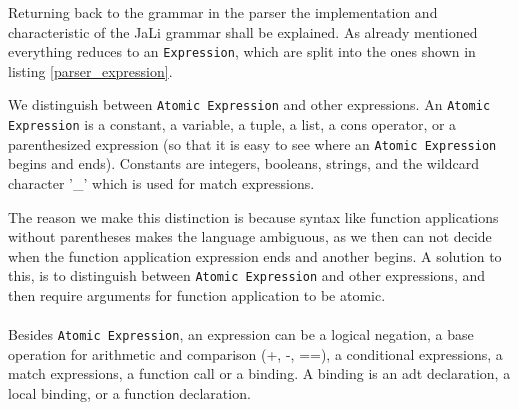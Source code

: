 Returning back to the grammar in the parser the implementation and characteristic of the JaLi grammar shall be explained.
As already mentioned everything reduces to an \texttt{Expression}, which are split into the ones shown in listing \ref{parser_expression}.

We distinguish between \texttt{Atomic Expression} and other expressions. An \texttt{Atomic Expression} is a constant, a variable, a tuple, a list, a cons operator, or a parenthesized expression (so that it is easy to see where an \texttt{Atomic Expression} begins and ends). Constants are integers, booleans, strings, and the wildcard character '\_' which is used for match expressions.

The reason we make this distinction is because syntax like function applications without parentheses makes the language ambiguous, as we then can not decide when the function application expression ends and another begins. A solution to this, is to distinguish between \texttt{Atomic Expression} and other expressions, and then require arguments for function application to be atomic. 
\\\\
Besides \texttt{Atomic Expression}, an expression can be a logical negation, a base operation for arithmetic and comparison (+, -, ==), a conditional expressions, a match expressions, a function call or a binding. A binding is an \gls{adt} declaration, a local binding, or a function declaration. 


